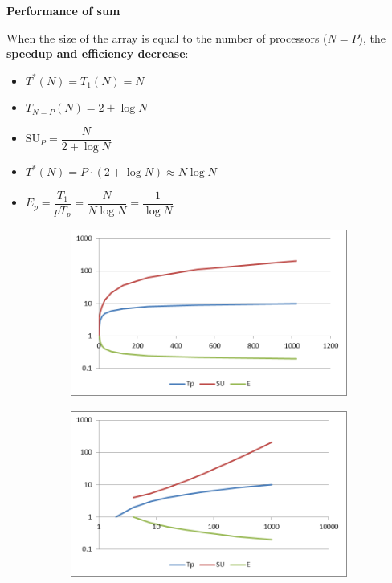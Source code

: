 \begin{flushleft}
    \textcolor{Green3}{ \textbf{Performance of sum}}
\end{flushleft}
When the size of the array is equal to the number of processors ($N = P$), the \textbf{speedup and efficiency decrease}:
\begin{itemize}
    \item $T^{*}\left(N\right) = T_{1}\left(N\right) = N$
    \item $T_{N=P}\left(N\right) = 2 + \log N$
    \item $\mathrm{SU}_{P} = \dfrac{N}{2+\log N}$
    \item $T^{*}\left(N\right) = P \cdot \left(2 + \log N\right) \approx N \log N$
    \item $E_{p} = \dfrac{T_{1}}{pT_{p}} = \dfrac{N}{N \log N} = \dfrac{1}{\log N}$
\end{itemize}
\begin{figure}[!htp]
    \centering
    \begin{subfigure}[h]{0.45\linewidth}
        \includegraphics[width=\linewidth]{img/SPDM-sum-2.png}
    \end{subfigure}
    \hfill
    \begin{subfigure}[h]{0.45\linewidth}
        \includegraphics[width=\linewidth]{img/SPDM-sum-3.png}
    \end{subfigure}
\end{figure}

